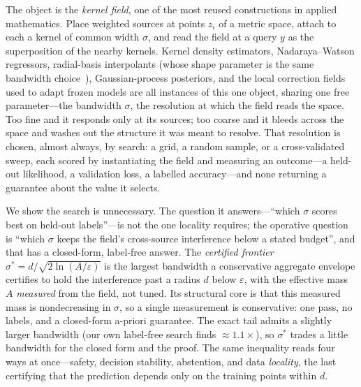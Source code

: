 \documentclass[10pt,twocolumn]{article}
\newcommand{\sstar}{\sigma^{*}}
\begin{document}
The object is the \emph{kernel field}, one of the most reused constructions in applied mathematics. Place weighted sources at points $z_i$ of a metric space, attach to each a kernel of common width $\sigma$, and read the field at a query $y$ as the superposition of the nearby kernels. Kernel density estimators, Nadaraya--Watson regressors, radial-basis interpolants (whose shape parameter is the same bandwidth choice~\cite{rippa1999}), Gaussian-process posteriors, and the local correction fields used to adapt frozen models are all instances of this one object, sharing one free parameter---the bandwidth $\sigma$, the resolution at which the field reads the space. Too fine and it responds only at its sources; too coarse and it bleeds across the space and washes out the structure it was meant to resolve. That resolution is chosen, almost always, by search: a grid, a random sample, or a cross-validated sweep, each scored by instantiating the field and measuring an outcome---a held-out likelihood, a validation loss, a labelled accuracy---and none returning a guarantee about the value it selects.

We show the search is unnecessary. The question it answers---``which $\sigma$ scores best on held-out labels''---is not the one locality requires; the operative question is ``which $\sigma$ keeps the field's cross-source interference below a stated budget'', and that has a closed-form, label-free answer. The \emph{certified frontier} $\sstar=d/\sqrt{2\ln(A/\varepsilon)}$ is the largest bandwidth a conservative aggregate envelope certifies to hold the interference past a radius $d$ below $\varepsilon$, with the effective mass $A$ \emph{measured} from the field, not tuned. Its structural core is that this measured mass is nondecreasing in $\sigma$, so a single measurement is conservative: one pass, no labels, and a closed-form a-priori guarantee. The exact tail admits a slightly larger bandwidth (our own label-free search finds $\approx\!1.1\times$), so $\sstar$ trades a little bandwidth for the closed form and the proof. The same inequality reads four ways at once---safety, decision stability, abstention, and data \emph{locality}, the last certifying that the prediction depends only on the training points within $d$.
\end{document}
